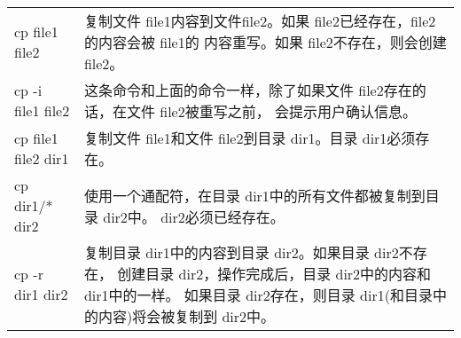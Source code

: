 \begin{center} 
\tablelasttail{\bottomrule}

\begin{supertabular}{p{3.5cm}p{10cm}}
cp file1 file2 & 复制文件 file1内容到文件file2。如果 file2已经存在，file2的内容会被 file1的 内容重写。如果 file2不存在，则会创建 file2。\\
cp -i file1 file2	& 这条命令和上面的命令一样，除了如果文件 file2存在的话，在文件 file2被重写之前， 会提示用户确认信息。\\
cp file1 file2 dir1	& 复制文件 file1和文件 file2到目录 dir1。目录 dir1必须存在。\\
cp dir1/* dir2	& 使用一个通配符，在目录 dir1中的所有文件都被复制到目录 dir2中。 dir2必须已经存在。\\
cp -r dir1 dir2 & 复制目录 dir1中的内容到目录 dir2。如果目录 dir2不存在， 创建目录 dir2，操作完成后，目录 dir2中的内容和 dir1中的一样。 如果目录 dir2存在，则目录 dir1(和目录中的内容)将会被复制到 dir2中。\\

\end{supertabular}
\end{center}
